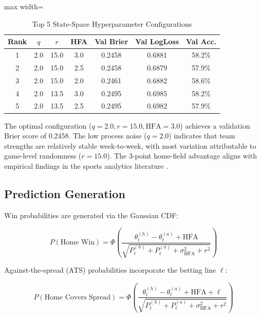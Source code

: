 \begin{table}[h]
\centering
\caption{Top 5 State-Space Hyperparameter Configurations}
\label{tab:state-space-hyperparameter-search}
\begin{adjustbox}{max width=\textwidth}
\begin{tabular}{ccccccc}
\toprule
\textbf{Rank} & $q$ & $r$ & \textbf{HFA} & \textbf{Val Brier} & \textbf{Val LogLoss} & \textbf{Val Acc.} \\
\midrule
1 & 2.0 & 15.0 & 3.0 & 0.2458 & 0.6881 & 58.2\% \\
2 & 2.0 & 15.0 & 2.5 & 0.2458 & 0.6879 & 57.9\% \\
3 & 2.0 & 15.0 & 2.0 & 0.2461 & 0.6882 & 58.6\% \\
4 & 2.0 & 13.5 & 3.0 & 0.2495 & 0.6985 & 58.2\% \\
5 & 2.0 & 13.5 & 2.5 & 0.2495 & 0.6982 & 57.9\% \\
\bottomrule
\end{tabular}
\end{adjustbox}
\end{table}

The optimal configuration ($q=2.0, r=15.0, \text{HFA}=3.0$) achieves a validation Brier score of 0.2458. The low process noise ($q = 2.0$) indicates that team strengths are relatively stable week-to-week, with most variation attributable to game-level randomness ($r = 15.0$). The 3-point home-field advantage aligns with empirical findings in the sports analytics literature \citep{moskowitz2011scorecasting}.

\subsection{Prediction Generation}

Win probabilities are generated via the Gaussian CDF:

\begin{equation}
P(\text{Home Win}) = \Phi\left(\frac{\theta_t^{(h)} - \theta_t^{(a)} + \text{HFA}}{\sqrt{P_t^{(h)} + P_t^{(a)} + \sigma_{\text{HFA}}^2 + r^2}}\right)
\label{eq:win-probability}
\end{equation}

Against-the-spread (ATS) probabilities incorporate the betting line $\ell$:

\begin{equation}
P(\text{Home Covers Spread}) = \Phi\left(\frac{\theta_t^{(h)} - \theta_t^{(a)} + \text{HFA} + \ell}{\sqrt{P_t^{(h)} + P_t^{(a)} + \sigma_{\text{HFA}}^2 + r^2}}\right)
\label{eq:ats-probability}
\end{equation}

